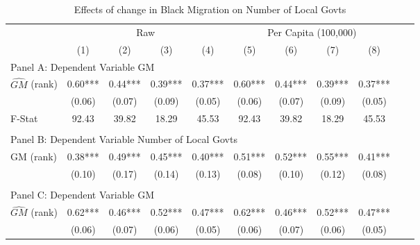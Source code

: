  \begin{table}[htbp]\centering {} \begin{threeparttable} \caption{Effects of change in Black Migration on Number of Local Govts} \begin{tabular}{l*{10}{c}} \toprule
                &\multicolumn{4}{c}{Raw}                                    &\multicolumn{4}{c}{Per Capita (100,000)}                   \\\cmidrule(lr){2-5}\cmidrule(lr){6-9}
                &\multicolumn{1}{c}{(1)}   &\multicolumn{1}{c}{(2)}   &\multicolumn{1}{c}{(3)}   &\multicolumn{1}{c}{(4)}   &\multicolumn{1}{c}{(5)}   &\multicolumn{1}{c}{(6)}   &\multicolumn{1}{c}{(7)}   &\multicolumn{1}{c}{(8)}   \\
\cmidrule(lr){1-9}
\multicolumn{8}{l}{Panel A: Dependent Variable GM}\\
\cmidrule(lr){1-9}
$\hat{GM}$ (rank)&       0.60***&       0.44***&       0.39***&       0.37***&       0.60***&       0.44***&       0.39***&       0.37***\\
                &     (0.06)   &     (0.07)   &     (0.09)   &     (0.05)   &     (0.06)   &     (0.07)   &     (0.09)   &     (0.05)   \\
\midrule
F-Stat          &      92.43   &      39.82   &      18.29   &      45.53   &      92.43   &      39.82   &      18.29   &      45.53   \\
\cmidrule[\heavyrulewidth](lr){1-9} \\ \cmidrule[\heavyrulewidth](lr){1-9}
\multicolumn{8}{l}{Panel B: Dependent Variable Number of Local Govts}\\
\cmidrule(lr){1-9}
GM  (rank)      &       0.38***&       0.49***&       0.45***&       0.40***&       0.51***&       0.52***&       0.55***&       0.41***\\
                &     (0.10)   &     (0.17)   &     (0.14)   &     (0.13)   &     (0.08)   &     (0.10)   &     (0.12)   &     (0.08)   \\
\cmidrule[\heavyrulewidth](lr){1-9} \\ \cmidrule[\heavyrulewidth](lr){1-9}
\multicolumn{8}{l}{Panel C: Dependent Variable GM}\\
\cmidrule(lr){1-9}
$\hat{GM}$ (rank)&       0.62***&       0.46***&       0.52***&       0.47***&       0.62***&       0.46***&       0.52***&       0.47***\\
                &     (0.06)   &     (0.07)   &     (0.06)   &     (0.05)   &     (0.06)   &     (0.07)   &     (0.06)   &     (0.05)   \\

\end{tabular}
\end{threeparttable}
\end{table}
